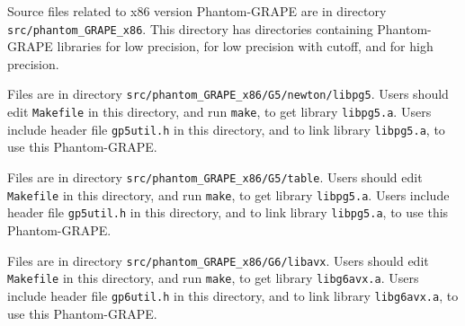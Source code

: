 
Source files related to x86 version Phantom-GRAPE are in directory
\texttt{src/phantom\_GRAPE\_x86}. This directory has directories containing
Phantom-GRAPE libraries for low precision, for low precision with cutoff, and
for high precision.


Files are in directory \texttt{src/phantom\_GRAPE\_x86/G5/newton/libpg5}.
Users should edit \texttt{Makefile} in this directory, and run \texttt{make},
to get library \texttt{libpg5.a}. Users include header file \texttt{gp5util.h}
in this directory, and to link library \texttt{libpg5.a}, to use this Phantom-GRAPE.


Files are in directory \texttt{src/phantom\_GRAPE\_x86/G5/table}.
Users should edit \texttt{Makefile} in this directory, and run \texttt{make},
to get library \texttt{libpg5.a}. Users include header file \texttt{gp5util.h}
in this directory, and to link library \texttt{libpg5.a}, to use this Phantom-GRAPE.


Files are in directory \texttt{src/phantom\_GRAPE\_x86/G6/libavx}.
Users should edit \texttt{Makefile} in this directory, and run \texttt{make},
to get library \texttt{libg6avx.a}. Users include header file \texttt{gp6util.h}
in this directory, and to link library \texttt{libg6avx.a}, to use this Phantom-GRAPE.

